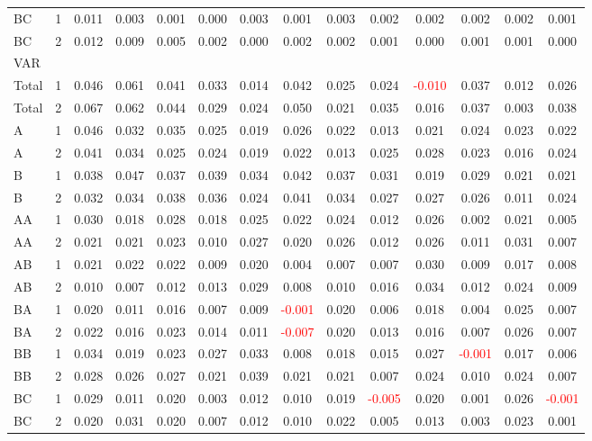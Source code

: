 \begin{table}[H]
{\begin{tabular}{llcccccccccccc}
BC & 1 & 0.011 & 0.003 & 0.001 & 0.000 & 0.003 & 0.001 & 0.003 & 0.002 & 0.002 & 0.002 & 0.002 & 0.001\\
BC & 2 & 0.012 & 0.009 & 0.005 & 0.002 & 0.000 & 0.002 & 0.002 & 0.001 & 0.000 & 0.001 & 0.001 & 0.000\\
\hline
VAR &  &  &  &  &  &  &  &  &  &  &  &  & \\
\hline
Total & 1 & 0.046 & 0.061 & 0.041 & 0.033 & 0.014 & 0.042 & 0.025 & 0.024 & \textcolor{red}{-0.010} & 0.037 & 0.012 & 0.026\\
Total & 2 & 0.067 & 0.062 & 0.044 & 0.029 & 0.024 & 0.050 & 0.021 & 0.035 & 0.016 & 0.037 & 0.003 & 0.038\\
A & 1 & 0.046 & 0.032 & 0.035 & 0.025 & 0.019 & 0.026 & 0.022 & 0.013 & 0.021 & 0.024 & 0.023 & 0.022\\
A & 2 & 0.041 & 0.034 & 0.025 & 0.024 & 0.019 & 0.022 & 0.013 & 0.025 & 0.028 & 0.023 & 0.016 & 0.024\\
B & 1 & 0.038 & 0.047 & 0.037 & 0.039 & 0.034 & 0.042 & 0.037 & 0.031 & 0.019 & 0.029 & 0.021 & 0.021\\
B & 2 & 0.032 & 0.034 & 0.038 & 0.036 & 0.024 & 0.041 & 0.034 & 0.027 & 0.027 & 0.026 & 0.011 & 0.024\\
AA & 1 & 0.030 & 0.018 & 0.028 & 0.018 & 0.025 & 0.022 & 0.024 & 0.012 & 0.026 & 0.002 & 0.021 & 0.005\\
AA & 2 & 0.021 & 0.021 & 0.023 & 0.010 & 0.027 & 0.020 & 0.026 & 0.012 & 0.026 & 0.011 & 0.031 & 0.007\\
AB & 1 & 0.021 & 0.022 & 0.022 & 0.009 & 0.020 & 0.004 & 0.007 & 0.007 & 0.030 & 0.009 & 0.017 & 0.008\\
AB & 2 & 0.010 & 0.007 & 0.012 & 0.013 & 0.029 & 0.008 & 0.010 & 0.016 & 0.034 & 0.012 & 0.024 & 0.009\\
BA & 1 & 0.020 & 0.011 & 0.016 & 0.007 & 0.009 & \textcolor{red}{-0.001} & 0.020 & 0.006 & 0.018 & 0.004 & 0.025 & 0.007\\
BA & 2 & 0.022 & 0.016 & 0.023 & 0.014 & 0.011 & \textcolor{red}{-0.007} & 0.020 & 0.013 & 0.016 & 0.007 & 0.026 & 0.007\\
BB & 1 & 0.034 & 0.019 & 0.023 & 0.027 & 0.033 & 0.008 & 0.018 & 0.015 & 0.027 & \textcolor{red}{-0.001} & 0.017 & 0.006\\
BB & 2 & 0.028 & 0.026 & 0.027 & 0.021 & 0.039 & 0.021 & 0.021 & 0.007 & 0.024 & 0.010 & 0.024 & 0.007\\
BC & 1 & 0.029 & 0.011 & 0.020 & 0.003 & 0.012 & 0.010 & 0.019 & \textcolor{red}{-0.005} & 0.020 & 0.001 & 0.026 & \textcolor{red}{-0.001}\\
BC & 2 & 0.020 & 0.031 & 0.020 & 0.007 & 0.012 & 0.010 & 0.022 & 0.005 & 0.013 & 0.003 & 0.023 & 0.001\\
\hline
    \end{tabular}%
    }
    \label{tab:cen8_sh}
\end{table}


